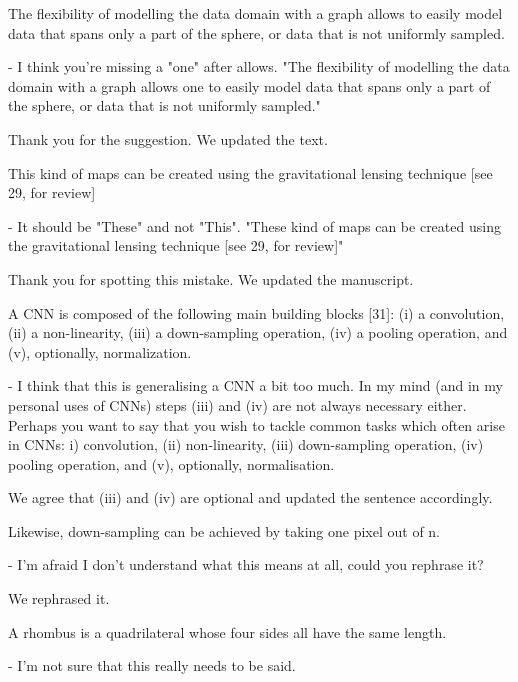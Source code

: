 \documentclass[12pt,a4paper]{article}
\newcommand{\1}{\b{1}}              %
\newcommand{\0}{\b{0}}              %
\begin{document}
\begin{mdframed}[style=comment]
The flexibility of modelling the data domain with a graph allows to easily model data that spans only a part of the sphere, or data that is not uniformly sampled.

- I think you're missing a "one" after allows. "The flexibility of modelling the data domain with a graph allows one to easily model data that spans only a part of the sphere, or data that is not uniformly sampled."
\end{mdframed}

Thank you for the suggestion. We updated the text.

\begin{mdframed}[style=comment]
This kind of maps can be created using the gravitational lensing technique [see 29, for review]

- It should be "These" and not "This". "These kind of maps can be created using the gravitational lensing technique [see 29, for review]"
\end{mdframed}

Thank you for spotting this mistake. We updated the manuscript.

\begin{mdframed}[style=comment]
A CNN is composed of the following main building blocks [31]: (i) a convolution, (ii) a non-linearity, (iii) a down-sampling operation, (iv) a pooling operation, and (v), optionally, normalization.

- I think that this is generalising a CNN a bit too much. In my mind (and in my personal uses of CNNs) steps (iii) and (iv) are not always necessary either. Perhaps you want to say that you wish to tackle common tasks which often arise in CNNs: i) convolution, (ii) non-linearity, (iii) down-sampling operation, (iv) pooling operation, and (v), optionally, normalisation.
\end{mdframed}

We agree that (iii) and (iv) are optional and updated the sentence accordingly.

\begin{mdframed}[style=comment]
Likewise, down-sampling can be achieved by taking one pixel out of n.

- I'm afraid I don't understand what this means at all, could you rephrase it?
\end{mdframed}

We rephrased it.

\begin{mdframed}[style=comment]
A rhombus is a quadrilateral whose four sides all have the same length.

- I'm not sure that this really needs to be said.
\end{mdframed}
\end{document}
